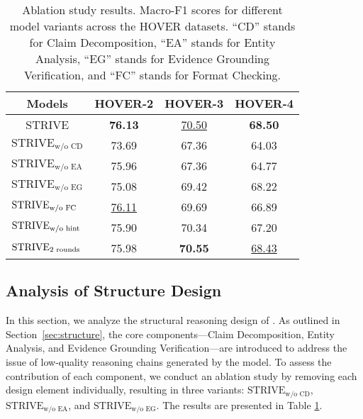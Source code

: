 \begin{table}[t]
  \centering
    \begin{adjustbox}{max width=\columnwidth}
  \setlength{\tabcolsep}{3.5pt}
    \begin{tabular}{lccc}
    \toprule
    \multicolumn{1}{c}{\textbf{Models}} & \textbf{HOVER-2} & \textbf{HOVER-3} & \textbf{HOVER-4} \\
    \midrule
    \multicolumn{1}{c}{STRIVE} & \textbf{76.13} & \underline{70.50}  & \textbf{68.50}\\
    \midrule
    $\text{STRIVE}_{\text{w/o CD}}$ & 73.69 & 67.36 & 64.03 \\
    $\text{STRIVE}_{\text{w/o EA}}$ & 75.96 & 67.36 & 64.77 \\
    $\text{STRIVE}_{\text{w/o EG}}$ & 75.08 & 69.42 & 68.22 \\
    \midrule
    $\text{STRIVE}_{\text{w/o FC}}$ & \underline{76.11} & 69.69 & 66.89 \\
    $\text{STRIVE}_{\text{w/o hint}}$ & 75.90  & 70.34 & 67.20 \\
    $\text{STRIVE}_{2\text{ rounds}}$ & 75.98 & \textbf{70.55} & \underline{68.43} \\
    \bottomrule
    \end{tabular}%
    \end{adjustbox}
    \caption{Ablation study results. Macro-F1 scores for different model variants across the HOVER datasets. ``CD'' stands for Claim Decomposition, ``EA'' stands for Entity Analysis, ``EG'' stands for Evidence Grounding Verification, and ``FC'' stands for Format Checking.}
  \label{tab:ablate}
\end{table}


\subsection{Analysis of Structure Design}
In this section, we analyze the structural reasoning design of \themodel. As outlined in Section~\ref{sec:structure}, the core components---Claim Decomposition, Entity Analysis, and Evidence Grounding Verification---are introduced to address the issue of low-quality reasoning chains generated by the model. To assess the contribution of each component, we conduct an ablation study by removing each design element individually, resulting in three variants: $\text{STRIVE}_{\text{w/o CD}}$, $\text{STRIVE}_{\text{w/o EA}}$, and $\text{STRIVE}_{\text{w/o EG}}$. The results are presented in Table \ref{tab:ablate}.


